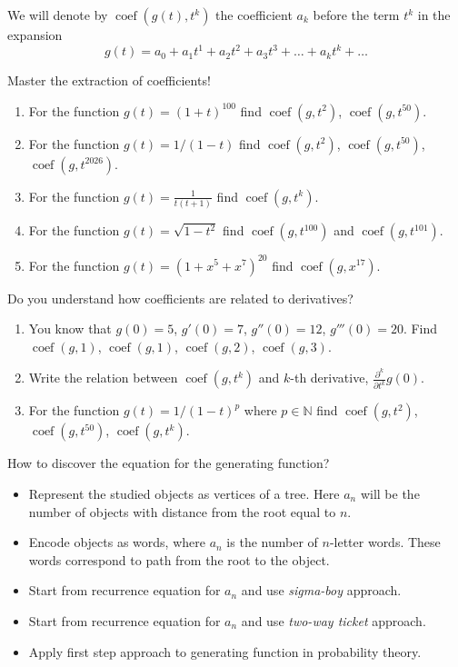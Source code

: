 \documentclass[12pt]{article}
\DeclareMathOperator{\coef}{coef}
\newcommand{\NN}{\mathbb{N}}
\begin{document}
\begin{definition}
    We will denote by $\coef(g(t), t^k)$ the coefficient $a_k$ before the term $t^k$ in the expansion
    \[
    g(t) =  a_0 + a_1 t^1 + a_2 t^2 + a_3 t^3 + \dots + a_k t^k + \dots
    \]
\end{definition}

\begin{exercise}
    Master the extraction of coefficients!
    \begin{enumerate}[label=\alph*)]
        \item For the function $g(t) = (1 + t)^{100}$ find $\coef(g, t^2)$, $\coef(g, t^{50})$.
        \item For the function $g(t) = 1/(1-t)$ find $\coef(g, t^2)$, $\coef(g, t^{50})$, $\coef(g, t^{2026})$.
        \item For the function $g(t) = \frac{1}{t(t+1)}$ find $\coef(g, t^k)$.
        \item For the function $g(t) = \sqrt{1 - t^2}$ find $\coef(g, t^{100})$ and $\coef(g, t^{101})$.
        \item For the function $g(t) = (1+x^5+x^7)^{20}$ find $\coef(g, x^{17})$.
    \end{enumerate}
\end{exercise}


\begin{exercise}
    Do you understand how coefficients are related to derivatives?
    \begin{enumerate}[label=\alph*)]
        \item You know that $g(0) = 5$, $g'(0) = 7$, $g''(0) = 12$, $g'''(0) = 20$. Find $\coef(g, 1)$, $\coef(g, 1)$, $\coef(g, 2)$, $\coef(g, 3)$.
        \item Write the relation between $\coef(g, t^k)$ and $k$-th derivative, $\frac{\partial^k}{\partial t^k}g(0)$.
        \item For the function $g(t) = 1/(1-t)^p$ where $p \in \NN$ find $\coef(g, t^2)$, $\coef(g, t^{50})$, $\coef(g, t^k)$.
    \end{enumerate}    
\end{exercise}

\begin{idea}
    How to discover the equation for the generating function?   
    \begin{itemize}
        \item Represent the studied objects as vertices of a tree. 
        Here $a_n$ will be the number of objects with distance from the root equal to $n$.
        \item Encode objects as words, where $a_n$ is the number of $n$-letter words. 
        These words correspond to path from the root to the object. 
        \item Start from recurrence equation for $a_n$ and use \emph{sigma-boy} approach. 
        \item Start from recurrence equation for $a_n$ and use \emph{two-way ticket} approach. 
        \item Apply first step approach to generating function in probability theory. 
    \end{itemize}
\end{idea}
\end{document}
